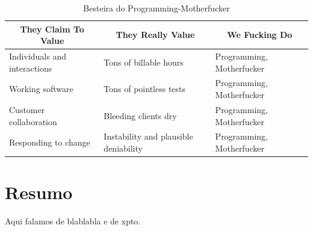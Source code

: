 \begin{table}[]
\centering
\begin{tabular}{lll}
\multicolumn{1}{c}{\textbf{They Claim To Value}}   & \multicolumn{1}{c}{\textbf{They Really Value}}             & \multicolumn{1}{c}{\textbf{We Fucking Do}}     \\ \hline
\multicolumn{1}{|l|}{Individuals and interactions} & \multicolumn{1}{l|}{Tons of billable hours}                & \multicolumn{1}{l|}{Programming, Motherfucker} \\ \hline
\multicolumn{1}{|l|}{Working software}             & \multicolumn{1}{l|}{Tons of pointless tests}               & \multicolumn{1}{l|}{Programming, Motherfucker} \\ \hline
\multicolumn{1}{|l|}{Customer collaboration}       & \multicolumn{1}{l|}{Bleeding clients dry}                  & \multicolumn{1}{l|}{Programming, Motherfucker} \\ \hline
\multicolumn{1}{|l|}{Responding to change}         & \multicolumn{1}{l|}{Instability and plausible deniability} & \multicolumn{1}{l|}{Programming, Motherfucker} \\ \hline
\end{tabular}
\caption{Besteira do Programming-Motherfucker}
\label{label-da-tabela}
\end{table}



\section*{Resumo}
Aqui falamos de blablabla e de xpto.